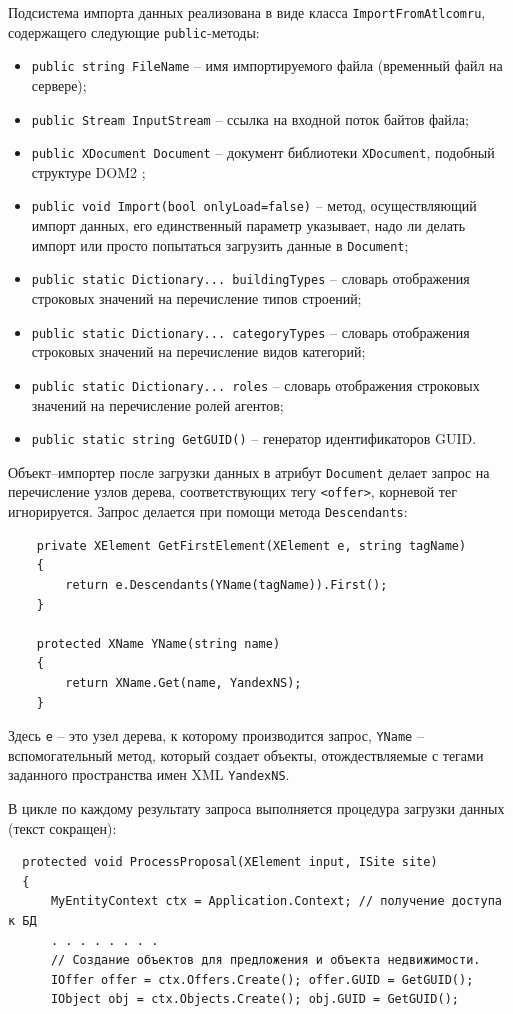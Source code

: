 \documentclass[a4paper,14pt,openany,final]{extreport} %
\begin{document}
{Подсистема импорта данных реализована в виде класса \verb|ImportFromAtlcomru|, содержащего следующие \verb|public|-методы:
\begin{itemize}[label={},leftmargin=0pt]
\item \verb|public string FileName| -- имя импортируемого файла (временный файл на сервере);
\item \verb|public Stream InputStream| -- ссылка на входной поток байтов файла;
\item \verb|public XDocument Document| -- документ библиотеки \verb|XDocument|, подобный структуре DOM2 \cite{dom2};
\item \verb|public void Import(bool onlyLoad=false)| -- метод, осуществляющий импорт данных, его единственный параметр указывает, надо ли делать импорт или просто попытаться загрузить данные в \verb|Document|;
\item \verb|public static Dictionary... buildingTypes| -- словарь отображения строковых значений на перечисление типов строений;
\item \verb|public static Dictionary... categoryTypes| -- словарь отображения строковых значений на перечисление видов категорий;
\item \verb|public static Dictionary... roles| -- словарь отображения строковых значений на перечисление ролей агентов;
\item \verb|public static string GetGUID()| -- генератор идентификаторов GUID.
\end{itemize}

Объект--импортер после загрузки данных в атрибут \verb|Document| делает запрос на перечисление узлов дерева, соответствующих тегу \verb|<offer>|, корневой тег игнорируется. Запрос делается при помощи метода \verb|Descendants|:
\begin{verbatim}
    private XElement GetFirstElement(XElement e, string tagName)
    {
        return e.Descendants(YName(tagName)).First();
    }

    protected XName YName(string name)
    {
        return XName.Get(name, YandexNS);
    }
\end{verbatim}
Здесь \verb|e| -- это узел дерева, к которому производится запрос, \verb|YName| -- вспомогательный метод, который создает объекты, отождествляемые с тегами заданного пространства имен XML \verb|YandexNS|.

В цикле по каждому результату запроса выполняется процедура загрузки данных (текст сокращен):
\begin{verbatim}
  protected void ProcessProposal(XElement input, ISite site)
  {
      MyEntityContext ctx = Application.Context; // получение доступа к БД
      . . . . . . . .
      // Создание объектов для предложения и объекта недвижимости.
      IOffer offer = ctx.Offers.Create(); offer.GUID = GetGUID();
      IObject obj = ctx.Objects.Create(); obj.GUID = GetGUID();


\end{verbatim}}
\end{document}
